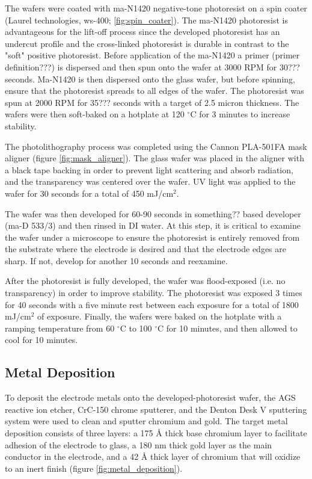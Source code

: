 \par The wafers were coated with ma-N1420 negative-tone photoresist on a spin coater (Laurel technologies, ws-400; \ref{fig:spin_coater}). The ma-N1420 photoresist is advantageous for the lift-off process since the developed photoresist has an undercut profile and the cross-linked photoresist is durable in contrast to the "soft" positive photoresist. Before application of the ma-N1420 a primer (primer definition???) is dispersed and then spun onto the wafer at 3000 RPM for 30??? seconds. Ma-N1420 is then dispersed onto the glass wafer, but before spinning, ensure that the photoresist spreads to all edges of the wafer. The photoresist was spun at 2000 RPM for 35??? seconds with a target of 2.5 micron thickness. The wafers were then soft-baked on a hotplate at 120 $^\circ$C for 3 minutes to increase stability. 

\par The photolithography process was completed using the Cannon PLA-501FA mask aligner (figure \ref{fig:mask_aligner}). The glass wafer was placed in the aligner with a black tape backing in order to prevent light scattering and absorb radiation, and the transparency was centered over the wafer. UV light was applied to the wafer for 30 seconds for a total of 450 mJ/cm$^2$. 

\par The wafer was then developed for 60-90 seconds in something?? based developer (ma-D 533/3) and then rinsed in DI water. At this step, it is critical to examine the wafer under a microscope to ensure the photoresist is entirely removed from the substrate where the electrode is desired and that the electrode edges are sharp. If not, develop for another 10 seconds and reexamine. 

\par After the photoresist is fully developed, the wafer was flood-exposed (i.e. no transparency) in order to improve stability. The photoresist was exposed 3 times for 40 seconds with a five minute rest between each exposure for a total of 1800 mJ/cm$^2$ of exposure. Finally, the wafers were baked on the hotplate with a ramping temperature from 60 $^\circ$C to 100 $^\circ$C for 10 minutes, and then allowed to cool for 10 minutes. 

\subsection*{Metal Deposition}

\par To deposit the electrode metals onto the developed-photoresist wafer, the AGS reactive ion etcher, CrC-150 chrome sputterer, and the Denton Desk V sputtering system were used to clean and sputter chromium and gold. The target metal deposition consists of three layers: a 175 \si{\angstrom} thick base chromium layer to facilitate adhesion of the electrode to glass, a 180 nm thick gold layer as the main conductor in the electrode, and a 42 \si{\angstrom} thick layer of chromium that will oxidize to an inert finish (figure \ref{fig:metal_deposition}).

